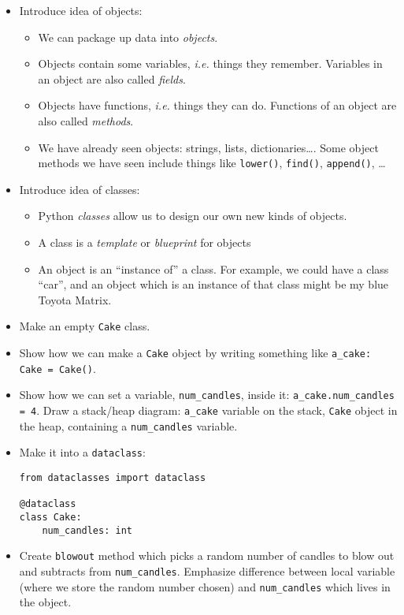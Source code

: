 \documentclass{article}
\begin{document}
\begin{itemize}
\item Introduce idea of objects:
  \begin{itemize}
  \item We can package up data into \emph{objects}.
  \item Objects contain some variables, \emph{i.e.} things they
    remember.  Variables in an object are also called \emph{fields}.
  \item Objects have functions, \emph{i.e.} things they can
    do. Functions of an object are also called \emph{methods}.
  \item We have already seen objects: strings, lists,
    dictionaries\dots.  Some object methods we have seen include
    things like \verb|lower()|, \verb|find()|, \verb|append()|, \dots
  \end{itemize}
\item Introduce idea of classes:
  \begin{itemize}
  \item Python \emph{classes} allow us to design our own new kinds of
    objects.
  \item A class is a \emph{template} or \emph{blueprint} for objects
  \item An object is an ``instance of'' a class.  For example,
    we could have a class ``car'', and an object which is an instance
    of that class might be my blue Toyota Matrix.
  \end{itemize}
\item Make an empty \verb|Cake| class.
\item Show how we can make a \verb|Cake| object by writing something
  like \verb|a_cake: Cake = Cake()|.
\item Show how we can set a variable, \verb|num_candles|, inside it:
  \verb|a_cake.num_candles = 4|. Draw a stack/heap diagram:
  \verb|a_cake| variable on the stack, \verb|Cake| object in the heap,
  containing a \verb|num_candles| variable.
\item Make it into a \verb|dataclass|:
\begin{verbatim}
from dataclasses import dataclass

@dataclass
class Cake:
    num_candles: int
\end{verbatim}

\item Create \verb|blowout| method which picks a random number of
  candles to blow out and subtracts from \verb|num_candles|.
  Emphasize difference between local variable (where we store the
  random number chosen) and \verb|num_candles| which lives in the
  object.
\end{itemize}
\end{document}
